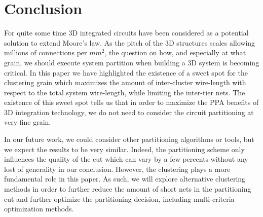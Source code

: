 \documentclass[conference]{IEEEtran}
\begin{document}
\section{Conclusion}\label{sec:concl}
For quite some time 3D integrated circuits have been considered as a potential solution to extend Moore's law.
As the pitch of the 3D structures scales allowing millions of connections per $mm^2$, the question on how, and especially at what grain, we should execute system partition when building a 3D system is becoming critical.
In this paper we have highlighted the existence of a sweet spot for the clustering grain which maximizes the amount of inter-cluster wire-length with respect to the total system wire-length, while limiting the inter-tier nets.
The existence of this sweet spot tells us that in order to maximize the PPA benefits of 3D integration technology, we do not need to consider the circuit partitioning at very fine grain.

In our future work, we could consider other partitioning algorithms or tools, but we expect the results to be very similar.
Indeed, the partitioning scheme only influences the quality of the cut which can vary by a few percents without any lost of generality in our conclusion.
However, the clustering plays a more fundamental role in this paper.
As such, we will explore alternative clustering methods in order to further reduce the amount of short nets in the partitioning cut and further optimize the partitioning decision, including multi-criteria optimization methods.

\clearpage






%


\end{document}
